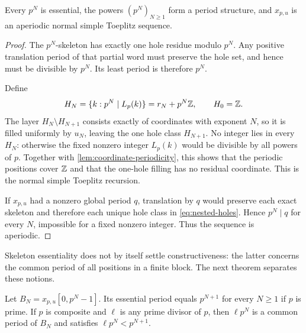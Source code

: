 \begin{corollary}
\label{cor:simple-toeplitz}
  Every $p^N$ is essential, the powers $(p^N)_{N\geq1}$ form a period
  structure, and $x_{p,u}$ is an aperiodic normal simple Toeplitz sequence.
\end{corollary}

\begin{proof}
  The $p^N$-skeleton has exactly one hole residue modulo $p^N$.  Any
  positive translation period of that partial word must preserve the hole
  set, and hence must be divisible by $p^N$.  Its least period is therefore
  $p^N$.

  Define
  \begin{equation}
    H_N=\{k:p^N\mid L_p(k)\}=r_N+p^N\mathbb Z,
    \qquad H_0=\mathbb Z.
    \label{eq:nested-holes}
  \end{equation}
  The layer $H_N\setminus H_{N+1}$ consists exactly of coordinates with
  exponent $N$, so it is filled uniformly by $u_N$, leaving the one hole
  class $H_{N+1}$.  No integer lies in every $H_N$: otherwise the fixed
  nonzero integer $L_p(k)$ would be divisible by all powers of $p$.
  Together with \cref{lem:coordinate-periodicity}, this shows that the
  periodic positions cover $\mathbb Z$ and that the one-hole filling has no
  residual coordinate.  This is the normal simple Toeplitz recursion.

  If $x_{p,u}$ had a nonzero global period $q$, translation by $q$ would
  preserve each exact skeleton and therefore each unique hole class in
  \cref{eq:nested-holes}.  Hence $p^N\mid q$ for every $N$, impossible for
  a fixed nonzero integer.  Thus the sequence is aperiodic.
\end{proof}

Skeleton essentiality does not by itself settle constructiveness: the
latter concerns the common period of all positions in a finite block.  The
next theorem separates these notions.

\begin{theorem}
\label{thm:constructive-split}
  Let $B_N=x_{p,u}[0,p^N-1]$.  Its essential period equals $p^{N+1}$ for
  every $N\geq1$ if $p$ is prime.  If $p$ is composite and $\ell$ is any
  prime divisor of $p$, then $\ell p^N$ is a common period of $B_N$ and
  satisfies $\ell p^N<p^{N+1}$.
\end{theorem}


